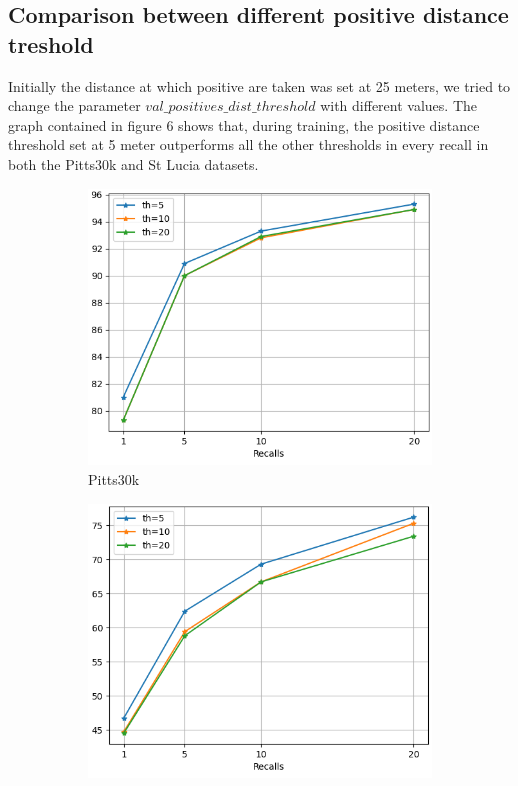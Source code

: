 \documentclass[10pt,twocolumn,letterpaper]{article}
\begin{document}
	\subsection{Comparison between different positive distance treshold}
	Initially the distance at which positive are taken was set at 25 meters, we tried to change the parameter ${val\_positives\_dist\_threshold}$ with different values. The graph contained in figure 6 shows that, during training, the positive distance threshold set at 5 meter outperforms all the other thresholds in every recall in both the Pitts30k and St Lucia datasets.\\
	\begin{figure}[!h]
		\centering
		\begin{subfigure}[b]{0.23\textwidth}
			\centering
			\includegraphics[width=\textwidth]{img/train_th/test_pitts30k_recalls_graph.png}
			\caption{Pitts30k}
			\label{fig:recalls:train_th:pitts30k}
		\end{subfigure}
		\hfill
		\begin{subfigure}[b]{0.23\textwidth}
			\centering
			\includegraphics[width=\textwidth]{img/train_th/test_st_lucia_recalls_graph.png}

\end{subfigure}
\end{figure}
\end{document}

